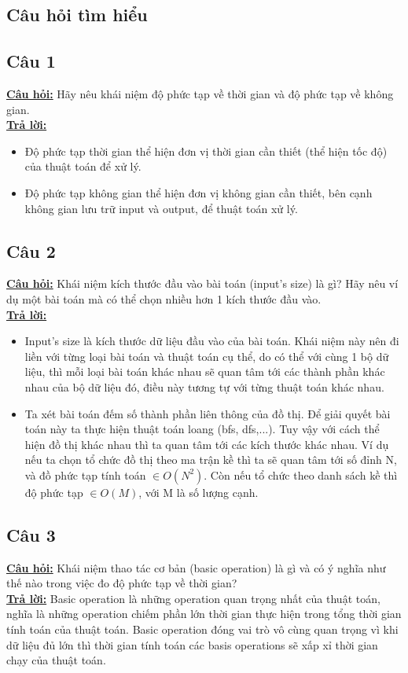 \documentclass[a4paper 14pt]{extarticle}
\begin{document}
	
	\pagebreak
	
	\begin{flushleft}
		\section{Câu hỏi tìm hiểu}
		\subsection{Câu 1}
		\underline{\textbf{Câu hỏi:}} Hãy nêu khái niệm độ phức tạp về thời gian và độ phức tạp về không gian.\\
		\underline{\textbf{Trả lời:}}
		\begin{itemize}
			\item Độ phức tạp thời gian thể hiện đơn vị thời gian cần thiết (thể hiện tốc độ) của thuật toán để xử lý.
			\item Độ phức tạp không gian thể hiện đơn vị không gian cần thiết, bên cạnh không gian lưu trữ input và output, để thuật toán xử lý.
		\end{itemize}
		\subsection{Câu 2}
		\underline{\textbf{Câu hỏi:}} Khái niệm kích thước đầu vào bài toán (input’s size) là gì? Hãy nêu ví dụ một bài toán mà có thể chọn nhiều hơn 1 kích thước đầu vào.\\
		\underline{\textbf{Trả lời:}}  \\
		\begin{itemize}
			\item Input's size là kích thước dữ liệu đầu vào của bài toán. Khái niệm này nên đi liền với từng loại bài toán và thuật toán cụ thể, do có thể với cùng 1 bộ dữ liệu, thì mỗi loại bài toán khác nhau sẽ quan tâm tới các thành phần khác nhau của bộ dữ liệu đó, điều này tương tự với từng thuật toán khác nhau.
			\item Ta xét bài toán đếm số thành phần liên thông của đồ thị. Để giải quyết bài toán này ta thực hiện thuật toán loang (bfs, dfs,...). Tuy vậy với cách thể hiện đồ thị khác nhau thì ta quan tâm tới các kích thước khác nhau. Ví dụ nếu ta chọn tổ chức đồ thị theo ma trận kề thì ta sẽ quan tâm tới số đỉnh N, và đồ phức tạp tính toán $\in O(N^2)$. Còn nếu tổ chức theo danh sách kề thì độ phức tạp $\in O(M)$, với M là số lượng cạnh.
		\end{itemize}
		\subsection{Câu 3}
		\underline{\textbf{Câu hỏi:}} Khái niệm thao tác cơ bản (basic operation) là gì và có ý nghĩa như thế nào trong việc đo độ phức tạp về thời gian?\\
		\underline{\textbf{Trả lời:}}  Basic operation là những operation quan trọng nhất của thuật toán, nghĩa là những operation chiếm phần lớn thời gian thực hiện trong tổng thời gian tính toán của thuật toán. Basic operation đóng vai trò vô cùng quan trọng vì khi dữ liệu đủ lớn thì thời gian tính toán các basis operations sẽ xấp xỉ thời gian chạy của thuật toán. 

\end{flushleft}
\end{document}
